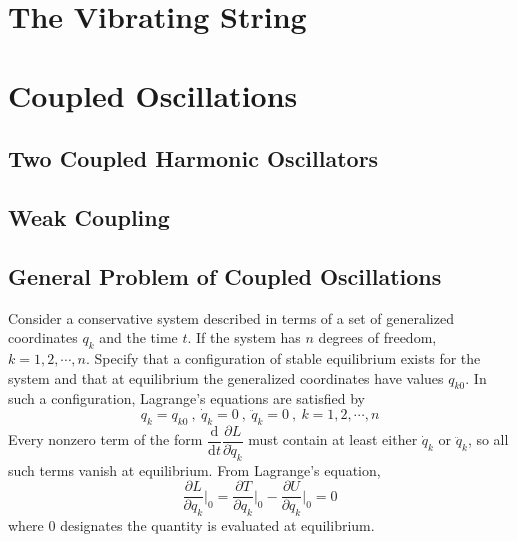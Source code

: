 \documentclass[11pt,a4paper]{article}
\newcommand{\dif}{\mathrm{d}}
\begin{document}
\section{The Vibrating String}
\cite{greiner2009classical} 	












































\section{Coupled Oscillations}
\cite{Thornton} 




\subsection{Two Coupled Harmonic Oscillators}


\subsection{Weak Coupling}


\subsection{General Problem of Coupled Oscillations}
Consider a conservative system described in terms of a set of generalized coordinates $q_k$ and the time $t$. If the system has $n$ degrees of freedom, $k = 1, 2, \cdots, n$. Specify that a configuration of stable equilibrium exists for the system and that at equilibrium the generalized coordinates have values $q_{k0}$. In such a configuration, Lagrange's equations are satisfied by
\begin{equation*}
q_k = q_{k0} ~, ~\dot{q}_k = 0 ~, ~\ddot{q}_k = 0 ~, ~ k = 1, 2, \cdots, n
\end{equation*}
Every nonzero term of the form $\dfrac{\dif }{\dif t} \dfrac{\partial L}{\partial \dot{q}_k}$ must contain at least either $\dot{q}_k$ or $\ddot{q}_k$, so all such terms vanish at equilibrium. From Lagrange's equation, 
\begin{equation}
\dfrac{\partial L}{\partial q_k} \Bigg|_0 = \dfrac{\partial T}{\partial q_k} \Bigg|_0 - \dfrac{\partial U}{\partial q_k} \Bigg|_0 = 0
\end{equation}
where $0$ designates the quantity is evaluated at equilibrium. 
\end{document}
